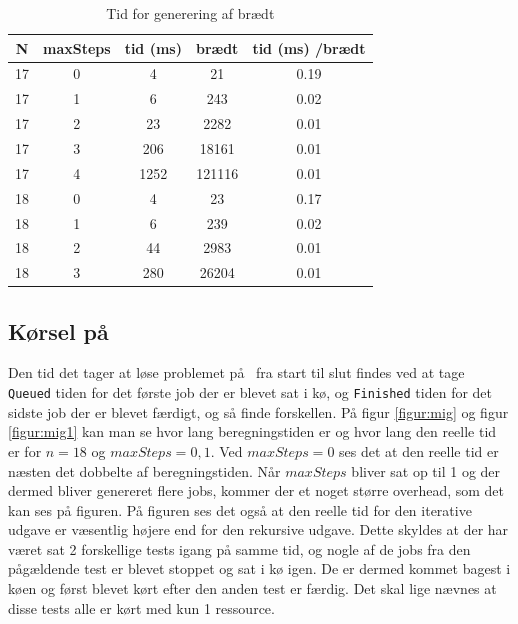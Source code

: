 \begin{table}
\begin{center}
\begin{tabular}{|c|c|c|c|c|}
\hline N & maxSteps & tid (ms) & brædt & tid (ms) /brædt \\
\hline 17 & 0 & 4 & 21 & 0.19 \\
\hline 17 & 1 & 6 & 243 & 0.02 \\
\hline 17 & 2 & 23 & 2282 & 0.01 \\
\hline 17 & 3 & 206 & 18161 & 0.01 \\
\hline 17 & 4 & 1252 & 121116 & 0.01 \\
\hline 18 & 0 & 4 & 23 & 0.17 \\
\hline 18 & 1 & 6 & 239 & 0.02 \\
\hline 18 & 2 & 44 & 2983 & 0.01 \\
\hline 18 & 3 & 280 & 26204 & 0.01 \\
\hline
\end{tabular}
\caption{Tid for generering af brædt}
\label{table:boardgenering}
\end{center}
\end{table}

\subsection{Kørsel på \mig}

Den tid det tager at løse problemet på \mig\ fra start til slut findes ved at
tage \texttt{Queued} tiden for det første job der er blevet sat i kø, og
\texttt{Finished} tiden for det sidste job der er blevet færdigt, og så finde
forskellen.  På figur \ref{figur:mig} og figur \ref{figur:mig1} kan man se hvor lang beregningstiden er og
hvor lang den reelle tid er for $n=18$ og $maxSteps=0,1$. Ved $maxSteps=0$
ses det at den reelle tid er næsten det dobbelte af beregningstiden. Når
$maxSteps$ bliver sat op til 1 og der dermed bliver genereret flere jobs, kommer
der et noget større overhead, som det kan ses på figuren. På figuren ses det
også at den reelle tid for den iterative udgave er væsentlig højere end for
den rekursive udgave. Dette skyldes at der har været sat 2 forskellige tests
igang på samme tid, og nogle af de jobs fra den pågældende test er blevet
stoppet og sat i kø igen. De er dermed kommet bagest i køen og først blevet kørt
efter den anden test er færdig. Det skal lige nævnes at disse tests alle er kørt
med kun 1 ressource.

